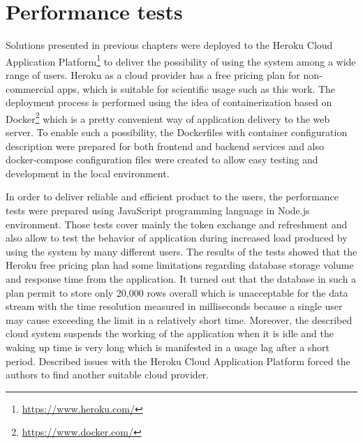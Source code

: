 \section{Performance tests}\label{sec:performance-tests}
Solutions presented in previous chapters were deployed to the Heroku Cloud Application Platform\footnote{\url{https://www.heroku.com/}} to deliver the possibility of using the system among a wide range of users.
Heroku as a cloud provider has a free pricing plan for non-commercial apps, which is suitable for scientific usage such as this work.
The deployment process is performed using the idea of containerization based on Docker\footnote{\url{https://www.docker.com/}} which is a pretty convenient way of application delivery to the web server.
To enable such a possibility, the Dockerfiles with container configuration description were prepared for both frontend and backend services and also docker-compose configuration files were created to allow easy testing and development in the local environment.

In order to deliver reliable and efficient product to the users, the performance tests were prepared using JavaScript programming language in Node.js environment.
Those tests cover mainly the token exchange and refreshment and also allow to test the behavior of application during increased load produced by using the system by many different users.
The results of the tests showed that the Heroku free pricing plan had some limitations regarding database storage volume and response time from the application.
It turned out that the database in such a plan permit to store only 20,000 rows overall which is unacceptable for the data stream with the time resolution measured in milliseconds because a single user may cause exceeding the limit in a relatively short time.
Moreover, the described cloud system suspends the working of the application when it is idle and the waking up time is very long which is manifested in a usage lag after a short period.
Described issues with the Heroku Cloud Application Platform forced the authors to find another suitable cloud provider.